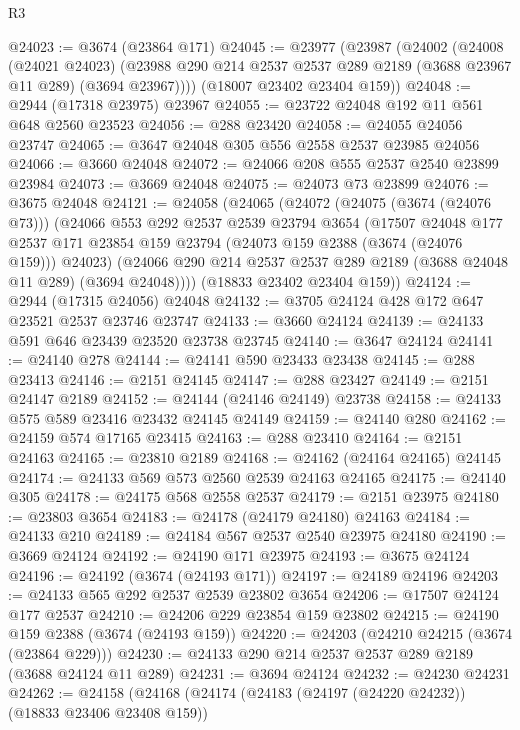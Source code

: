 \begin{lexlean}{R3}
\begin{coremodule}
@24023 := @3674 (@23864 @171)
@24045 := @23977
    (@23987
      (@24002
        (@24008
          (@24021 @24023)
          (@23988 @290 @214 @2537 @2537 @289 @2189 (@3688 @23967 @11 @289) (@3694 @23967))))
      (@18007 @23402 @23404 @159))
@24048 := @2944 (@17318 @23975) @23967
@24055 := @23722 @24048 @192 @11 @561 @648 @2560 @23523
@24056 := @288 @23420
@24058 := @24055 @24056 @23747
@24065 := @3647 @24048 @305 @556 @2558 @2537 @23985 @24056
@24066 := @3660 @24048
@24072 := @24066 @208 @555 @2537 @2540 @23899 @23984
@24073 := @3669 @24048
@24075 := @24073 @73 @23899
@24076 := @3675 @24048
@24121 := @24058
    (@24065
      (@24072
        (@24075 (@3674 (@24076 @73)))
        (@24066
          @553
          @292
          @2537
          @2539
          @23794
          @3654
          (@17507
            @24048
            @177
            @2537
            @171
            @23854
            @159
            @23794
            (@24073 @159 @2388 (@3674 (@24076 @159)))
            @24023)
          (@24066 @290 @214 @2537 @2537 @289 @2189 (@3688 @24048 @11 @289) (@3694 @24048))))
      (@18833 @23402 @23404 @159))
@24124 := @2944 (@17315 @24056) @24048
@24132 := @3705 @24124 @428 @172 @647 @23521 @2537 @23746 @23747
@24133 := @3660 @24124
@24139 := @24133 @591 @646 @23439 @23520 @23738 @23745
@24140 := @3647 @24124
@24141 := @24140 @278
@24144 := @24141 @590 @23433 @23438
@24145 := @288 @23413
@24146 := @2151 @24145
@24147 := @288 @23427
@24149 := @2151 @24147 @2189
@24152 := @24144 (@24146 @24149) @23738
@24158 := @24133 @575 @589 @23416 @23432 @24145 @24149
@24159 := @24140 @280
@24162 := @24159 @574 @17165 @23415
@24163 := @288 @23410
@24164 := @2151 @24163
@24165 := @23810 @2189
@24168 := @24162 (@24164 @24165) @24145
@24174 := @24133 @569 @573 @2560 @2539 @24163 @24165
@24175 := @24140 @305
@24178 := @24175 @568 @2558 @2537
@24179 := @2151 @23975
@24180 := @23803 @3654
@24183 := @24178 (@24179 @24180) @24163
@24184 := @24133 @210
@24189 := @24184 @567 @2537 @2540 @23975 @24180
@24190 := @3669 @24124
@24192 := @24190 @171 @23975
@24193 := @3675 @24124
@24196 := @24192 (@3674 (@24193 @171))
@24197 := @24189 @24196
@24203 := @24133 @565 @292 @2537 @2539 @23802 @3654
@24206 := @17507 @24124 @177 @2537
@24210 := @24206 @229 @23854 @159 @23802
@24215 := @24190 @159 @2388 (@3674 (@24193 @159))
@24220 := @24203 (@24210 @24215 (@3674 (@23864 @229)))
@24230 := @24133 @290 @214 @2537 @2537 @289 @2189 (@3688 @24124 @11 @289)
@24231 := @3694 @24124
@24232 := @24230 @24231
@24262 := @24158
    (@24168
      (@24174
        (@24183 (@24197 (@24220 @24232)) (@18833 @23406 @23408 @159))

\end{coremodule}
\end{lexlean}
